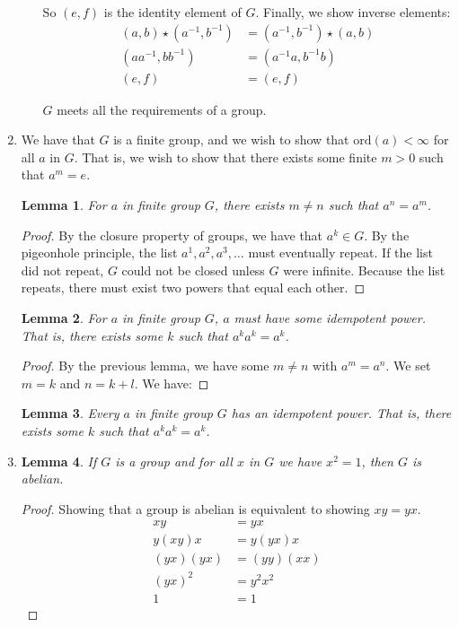 \documentclass[12pt]{article}
\newtheorem{lemma}{Lemma}
\begin{document}
\begin{enumerate}
\begin{enumerate}[(a)]
So $(e, f)$ is the identity element of $G$. Finally, we show inverse elements:
\begin{align*}
(a, b) \star (a^{-1}, b^{-1}) &= (a^{-1}, b^{-1}) \star (a, b)\\
(aa^{-1}, bb^{-1}) &= (a^{-1}a, b^{-1}b)\\
(e, f) &= (e, f)
\end{align*}

$G$ meets all the requirements of a group.

\end{enumerate}

\item We have that $G$ is a finite group, and we wish to show that $\text{ord}(a) < \infty$ for all $a$ in $G$. That is, we wish to show that there exists some finite $m > 0$ such that $a^m = e$. 

\begin{lemma}
For $a$ in finite group $G$, there exists $m \neq n$ such that $a^n = a^m$.
\end{lemma}
\begin{proof}
By the closure property of groups, we have that $a^k \in G$. By the pigeonhole principle, the list $a^1, a^2, a^3,\ldots$ must eventually repeat. If the list did not repeat, $G$ could not be closed unless $G$ were infinite. Because the list repeats, there must exist two powers that equal each other.
\end{proof}

\begin{lemma}
For $a$ in finite group $G$, $a$ must have some idempotent power. That is, there exists some $k$ such that $a^k a^k = a^k$.
\end{lemma}
\begin{proof}
By the previous lemma, we have some $m \neq n$ with $a^m = a^n$. We set $m = k$ and $n = k + l$. We have:


\end{proof}

\begin{lemma}
Every $a$ in finite group $G$ has an idempotent power. That is, there exists some $k$ such that $a^k a^k = a^k$.
\end{lemma}

\item 
\begin{lemma}
If $G$ is a group and for all $x$ in $G$ we have $x^2 = 1$, then $G$ is abelian.
\end{lemma}
\begin{proof}
Showing that a group is abelian is equivalent to showing $xy = yx$.
\begin{align*}
xy &= yx\\
y(xy)x &= y(yx)x\\
(yx)(yx) &= (yy)(xx)\\
(yx)^2 &= y^2 x^2\\
1 &= 1
\end{align*}

\end{proof}


\end{enumerate}
\end{document}
